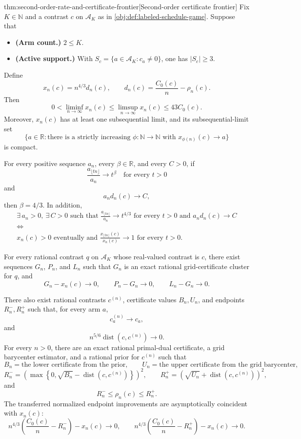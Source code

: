 \begin{theoremv}{thm:second-order-rate-and-certificate-frontier}[Second-order certificate frontier]
Fix \(K\in\mathbb N\) and a contrast \(c\) on \(\mathcal A_K\) as in \cref{obj:def:labeled-schedule-game}.  Suppose that
\begin{itemize}
\item \textbf{(Arm count.)} \(2\le K\).
\item \textbf{(Active support.)} With \(S_c=\{a\in\mathcal A_K:c_a\ne0\}\), one has \(|S_c|\ge3\).
\end{itemize}
Define
\[
x_n(c)=n^{4/3}d_n(c),
\qquad
d_n(c)=\frac{C_0(c)}{n}-\rho_n(c).
\]
Then
\[
0<\liminf_{n\to\infty}x_n(c)
\le
\limsup_{n\to\infty}x_n(c)
\le
43C_0(c).
\]
Moreover, \(x_n(c)\) has at least one subsequential limit, and its subsequential-limit set
\[
\{a\in\mathbb R:\text{there is a strictly increasing }\phi:\mathbb N\to\mathbb N
\text{ with }x_{\phi(n)}(c)\to a\}
\]
is compact.

For every positive sequence \(a_n\), every \(\beta\in\mathbb R\), and every \(C>0\), if
\[
\frac{a_{\lfloor tn\rfloor}}{a_n}\to t^\beta
\quad\text{for every }t>0
\]
and
\[
a_n d_n(c)\to C,
\]
then \(\beta=4/3\).  In addition,
\[
\begin{gathered}
\exists\, a_n>0,\ \exists\, C>0
\text{ such that }
\frac{a_{\lfloor tn\rfloor}}{a_n}\to t^{4/3}
\text{ for every }t>0
\text{ and }a_n d_n(c)\to C
\\
\Longleftrightarrow
\\
x_n(c)>0\text{ eventually and }
\frac{x_{\lfloor tn\rfloor}(c)}{x_n(c)}\to1
\text{ for every }t>0 .
\end{gathered}
\]

For every rational contrast \(q\) on \(\mathcal A_K\) whose real-valued contrast is \(c\), there exist sequences \(G_n\), \(P_n\), and \(L_n\) such that \(G_n\) is an exact rational grid-certificate cluster for \(q\), and
\[
G_n-x_n(c)\to0,\qquad
P_n-G_n\to0,\qquad
L_n-G_n\to0.
\]

There also exist rational contrasts \(c^{(n)}\), certificate values \(B_n,U_n\), and endpoints \(R_n^-,R_n^+\) such that, for every arm \(a\),
\[
c_a^{(n)}\to c_a,
\]
and
\[
n^{5/6}\operatorname{dist}(c,c^{(n)})\to0.
\]
For every \(n>0\), there are an exact rational primal-dual certificate, a grid barycenter estimator, and a rational prior for \(c^{(n)}\) such that
\[
B_n=\text{the lower certificate from the prior},
\qquad
U_n=\text{the upper certificate from the grid barycenter},
\]
\[
R_n^-=
\left(\max\left\{0,\sqrt{B_n}-\operatorname{dist}(c,c^{(n)})\right\}\right)^2,
\qquad
R_n^+=
\left(\sqrt{U_n}+\operatorname{dist}(c,c^{(n)})\right)^2,
\]
and
\[
R_n^-\le \rho_n(c)\le R_n^+.
\]
The transferred normalized endpoint improvements are asymptotically coincident with \(x_n(c)\):
\[
n^{4/3}\left(\frac{C_0(c)}{n}-R_n^-\right)-x_n(c)\to0,
\qquad
n^{4/3}\left(\frac{C_0(c)}{n}-R_n^+\right)-x_n(c)\to0.
\]


\end{theoremv}
